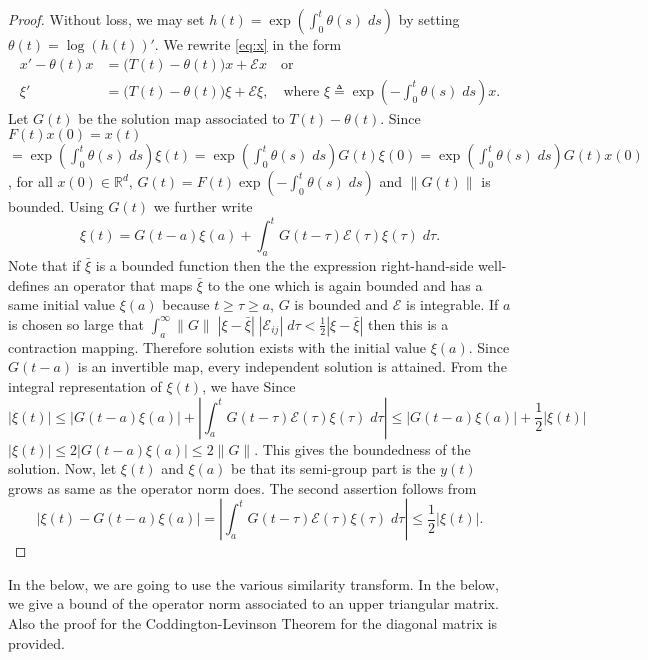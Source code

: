 \documentclass[a4paper,11pt]{article}
\theoremstyle{remark}
\begin{document}
\begin{proof}
 Without loss, we may set $h(t) = \exp\left(\int_0^t \theta(s)\; ds\right)$ by setting $\theta(t) = \log(h(t))'$. We rewrite \eqref{eq:x} in the form
 \begin{align*}
  x' - \theta(t)x &= \big(T(t)-\theta(t)\big)x + \mathcal{E}x \quad \text{or}\\
  \xi' &=\big(T(t)-\theta(t)\big)\xi + \mathcal{E}\xi, \quad \text{where $\xi\triangleq \exp\left(-\int_0^t \theta(s)\; ds\right) x$}.
 \end{align*}
 Let $G(t)$ be the solution map associated to $T(t)-\theta(t)$. Since $F(t)x(0)=x(t)$ \\$= \exp\left(\int_0^t \theta(s)\; ds\right)\xi(t)= \exp\left(\int_0^t \theta(s)\; ds\right)G(t)\xi(0)=\exp\left(\int_0^t \theta(s)\; ds\right)G(t)x(0)$, for all $x(0)\in \mathbb{R}^d$, $G(t) = F(t)\exp\left(-\int_0^t \theta(s)\; ds\right)$ and $\|G(t)\|$ is bounded. Using $G(t)$ we further write
 $$ \xi(t) = G(t-a)\xi(a) + \int_a^t G(t-\tau)\mathcal{E}(\tau)\xi(\tau) \; d\tau.$$
 Note that if $\bar\xi$ is a bounded function then the the expression right-hand-side well-defines an operator that maps $\bar\xi$ to the one which is again bounded and has a same initial value $\xi(a)$ because $t\ge \tau\ge a$, $G$ is bounded and $\mathcal{E}$ is integrable. If $a$ is chosen so large that $\int_a^\infty \|G\| \; |\xi-\bar\xi| \; |\mathcal{E}_{ij}|\; d\tau < \frac{1}{2} |\xi-\bar\xi|$ then this is a contraction mapping. Therefore solution exists with the initial value $\xi(a)$. Since $G(t-a)$ is an invertible map, every independent solution is attained.
 From the integral representation of $\xi(t)$, we have
 Since $$|\xi(t)| \le |G(t-a)\xi(a)| + \left|\int_a^t G(t-\tau)\mathcal{E}(\tau)\xi(\tau) \; d\tau\right| \le |G(t-a)\xi(a)| + \frac{1}{2} |\xi(t)|$$
 $|\xi(t)| \le 2 |G(t-a)\xi(a)| \le 2\|G\|$. This gives the boundedness of the solution. Now, let $\xi(t)$ and $\xi(a)$ be that its semi-group part is the $y(t)$ grows as same as the operator norm does. The second assertion follows from
 $$\big|\xi(t) - G(t-a)\xi(a)\big| = \left|\int_a^t G(t-\tau)\mathcal{E}(\tau)\xi(\tau) \; d\tau\right| \le \frac{1}{2} |\xi(t)|.$$
\end{proof} 
In the below, we are going to use the various similarity transform. In the below, we give a bound of the operator norm associated to an upper triangular matrix. Also the proof for the Coddington-Levinson Theorem for the diagonal matrix is provided.
\end{document}
